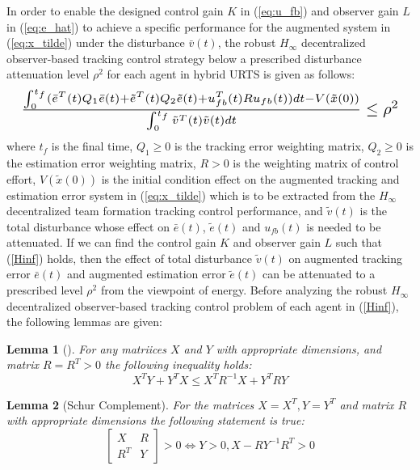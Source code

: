 \documentclass[journal,12pt,onecolumn,draftclsnofoot,]{IEEEtran}
\newtheorem{lemma}{Lemma}
\begin{document}
In order to enable the designed control gain $K$ in (\ref{eq:u_fb}) and observer gain $L$ in (\ref{eq:e_hat}) to achieve a specific performance for the augmented system in (\ref{eq:x_tilde}) under the disturbance $\bar{v}(t)$, the robust $H_\infty$ decentralized observer-based tracking control strategy below a prescribed disturbance attenuation level $\rho^2$ for each agent in hybrid URTS is given as follows:
\begin{equation} \label{Hinf}
    \resizebox{1\hsize}{!}{    
        $\frac{\int_{0}^{t_f}(\bar{e}^T(t)Q_1\bar{e}(t) + \tilde{e}^T(t)Q_2\tilde{e}(t) + u_{fb}^T(t)Ru_{fb}(t))dt - V(\tilde{x}(0))}{\int_{0}^{t_f}\tilde{v}^T(t)\tilde{v}(t)dt}\leq \rho^2$
    }
\end{equation}
where $t_f$ is the final time, $Q_1 \geq 0$ is the tracking error weighting matrix, $Q_2 \geq 0$ is the estimation error weighting matrix, $R > 0$ is the weighting matrix of control effort, $V(\tilde{x}(0))$ is the initial condition effect on the augmented tracking and estimation error system in (\ref{eq:x_tilde}) which is to be extracted from the $H_\infty$ decentralized team formation tracking control performance, and $\tilde{v}(t)$ is the total disturbance whose effect on $\bar{e}(t)$, $\tilde{e}(t)$ and $u_{fb}(t)$ is needed to be attenuated. If we can find the control gain $K$ and observer gain $L$ such that (\ref{Hinf}) holds, then the effect of total disturbance $\tilde{v}(t)$ on augmented tracking error $\bar{e}(t)$ and augmented estimation error $\tilde{e}(t)$ can be attenuated to a prescribed level $\rho^2$ from the viewpoint of energy. Before analyzing the robust $H_\infty$ decentralized observer-based tracking control problem of each agent in (\ref{Hinf}), the following lemmas are given:
\begin{lemma}[\cite{boyd1994linear}] \label{lemma1}
    For any matriices $X$ and $Y$ with appropriate dimensions, and matrix $R=R^T>0$ the following inequality holds:
    \begin{equation} \label{}
        X^T Y + Y^T X \leq X^T R^{-1}X + Y^T R Y
    \end{equation}  
\end{lemma}
\begin{lemma}[Schur Complement\cite{boyd1994linear}] \label{lemma2}
    For the matrices $X=X^T,Y=Y^T$ and matrix $R$ with appropriate dimensions the following statement is true:
    \begin{equation} \label{}
        \begin{bmatrix}
            X & R \\ R^T & Y 
        \end{bmatrix} > 0 \Leftrightarrow Y>0, X-RY^{-1}R^T>0
    \end{equation}
\end{lemma}
\end{document}
